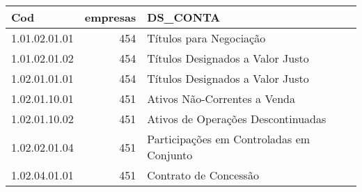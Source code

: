 \begin{table}[ht]
\centering
\begin{tabular}{lrl}
  \hline
Cod & empresas & DS\_CONTA \\ 
  \hline
1.01.02.01.01 & 454 & Títulos para Negociação \\ 
  1.01.02.01.02 & 454 & Títulos Designados a Valor Justo \\ 
  1.02.01.01.01 & 454 & Títulos Designados a Valor Justo \\ 
  1.02.01.10.01 & 451 & Ativos Não-Correntes a Venda \\ 
  1.02.01.10.02 & 451 & Ativos de Operações Descontinuadas \\ 
  1.02.02.01.04 & 451 & Participações em Controladas em Conjunto \\ 
  1.02.04.01.01 & 451 & Contrato de Concessão \\ 
   \hline
\end{tabular}
\end{table}

